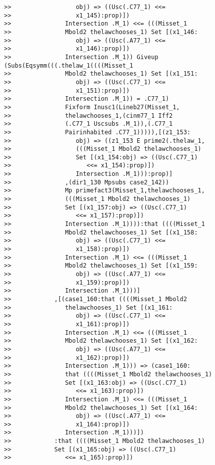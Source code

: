 \documentclass[12pt]{article}
\begin{document}
\begin{verbatim}
>>                  obj) => ((Usc(.C77_1) <<=
>>                  x1_145):prop)])
>>               Intersection .M_1) <<= (((Misset_1
>>               Mbold2 thelawchooses_1) Set [(x1_146:
>>                  obj) => ((Usc(.A77_1) <<=
>>                  x1_146):prop)])
>>               Intersection .M_1)) Giveup (Subs(Eqsymm(((.thelaw_1((((Misset_1
>>               Mbold2 thelawchooses_1) Set [(x1_151:
>>                  obj) => ((Usc(.C77_1) <<=
>>                  x1_151):prop)])
>>               Intersection .M_1)) = .C77_1)
>>               Fixform Inusc1(Lineb27(Misset_1,
>>               thelawchooses_1,(cinm77_1 Iff2
>>               (.C77_1 Uscsubs .M_1)),(.C77_1
>>               Pairinhabited .C77_1))))),[(z1_153:
>>                  obj) => ((z1_153 E prime2(.thelaw_1,
>>                  (((Misset_1 Mbold2 thelawchooses_1)
>>                  Set [(x1_154:obj) => ((Usc(.C77_1)
>>                     <<= x1_154):prop)])
>>                  Intersection .M_1))):prop)]
>>               ,(dir1_130 Mpsubs case2_142))
>>               Mp primefact3(Misset_1,thelawchooses_1,
>>               (((Misset_1 Mbold2 thelawchooses_1)
>>               Set [(x1_157:obj) => ((Usc(.C77_1)
>>                  <<= x1_157):prop)])
>>               Intersection .M_1)))):that ((((Misset_1
>>               Mbold2 thelawchooses_1) Set [(x1_158:
>>                  obj) => ((Usc(.C77_1) <<=
>>                  x1_158):prop)])
>>               Intersection .M_1) <<= (((Misset_1
>>               Mbold2 thelawchooses_1) Set [(x1_159:
>>                  obj) => ((Usc(.A77_1) <<=
>>                  x1_159):prop)])
>>               Intersection .M_1)))]
>>            ,[(case1_160:that ((((Misset_1 Mbold2
>>               thelawchooses_1) Set [(x1_161:
>>                  obj) => ((Usc(.C77_1) <<=
>>                  x1_161):prop)])
>>               Intersection .M_1) <<= (((Misset_1
>>               Mbold2 thelawchooses_1) Set [(x1_162:
>>                  obj) => ((Usc(.A77_1) <<=
>>                  x1_162):prop)])
>>               Intersection .M_1))) => (case1_160:
>>               that ((((Misset_1 Mbold2 thelawchooses_1)
>>               Set [(x1_163:obj) => ((Usc(.C77_1)
>>                  <<= x1_163):prop)])
>>               Intersection .M_1) <<= (((Misset_1
>>               Mbold2 thelawchooses_1) Set [(x1_164:
>>                  obj) => ((Usc(.A77_1) <<=
>>                  x1_164):prop)])
>>               Intersection .M_1)))])
>>            :that ((((Misset_1 Mbold2 thelawchooses_1)
>>            Set [(x1_165:obj) => ((Usc(.C77_1)
>>               <<= x1_165):prop)])

\end{verbatim}
\end{document}
